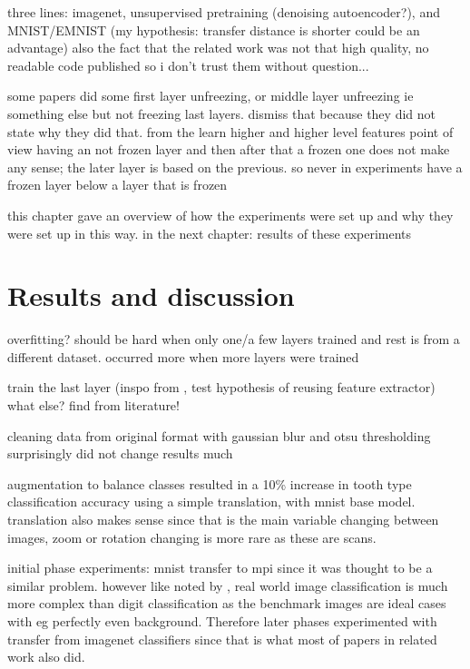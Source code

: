 \documentclass{article}
\begin{document}
three lines: imagenet, unsupervised pretraining (denoising autoencoder?), and MNIST/EMNIST (my hypothesis: transfer distance is shorter could be an advantage)
also the fact that the related work was not that high quality, no readable code published so i don't trust them without question...

some papers did some first layer unfreezing, or middle layer unfreezing ie something else 
but not freezing last layers. dismiss that because 
they did not state why they did that. from the learn higher and higher level features point of view 
having an not frozen layer and then after that a frozen one does not make any sense; the later 
layer is based on the previous. so never in experiments have a frozen layer below a layer that is frozen

this chapter gave an overview of how the experiments were set up and why they were set up in this way.
in the next chapter: results of these experiments

\section{Results and discussion}



overfitting? should be hard when only one/a few layers trained and rest is from a different dataset.
occurred more when more layers were trained

train the last layer (inspo from \cite{tibetan_ocr}, test hypothesis of reusing feature extractor)
what else? find from literature!

cleaning data from original format with gaussian blur and otsu thresholding surprisingly did not 
change results much 

augmentation to balance classes resulted in a 10\% increase in tooth type classification accuracy 
using a simple translation, with mnist base model. translation also makes sense since that is the main variable changing 
between images, zoom or rotation changing is more rare as these are scans.

initial phase experiments: mnist transfer to mpi since it was thought to be a similar problem. 
however like noted by \cite{alexnet}, real world image classification is much more complex than digit classification 
as the benchmark images are ideal cases with eg perfectly even background. Therefore later phases 
experimented with transfer from imagenet classifiers since that is what most of papers in related work also did.
\end{document}
